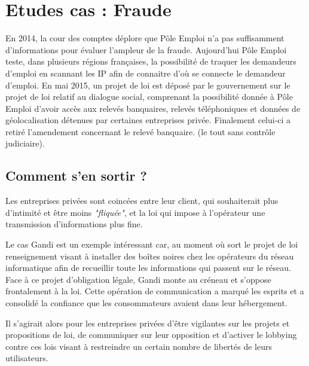 \documentclass[a4paper,12pt]{article}
\begin{document}
\section{Etudes cas : Fraude }
En 2014, la cour des comptes déplore que Pôle Emploi n'a pas suffisamment d'informations pour évaluer l'ampleur de la fraude. Aujourd'hui Pôle Emploi teste, dans plusieurs régions françaises, la possibilité de traquer les demandeurs d'emploi en scannant les IP afin de connaitre d'où se connecte le demandeur d'emploi. 
En mai 2015, un projet de loi est déposé par le gouvernement sur le projet de loi relatif au dialogue social, comprenant la possibilité donnée à Pôle Emploi d'avoir accès aux relevés banquaires, relevés téléphoniques et données de géolocalisation détenues par certaines entreprises privée. Finalement celui-ci a retiré l'amendement concernant le relevé banquaire. (le tout sans contrôle judiciaire). 
\subsection{Comment s'en sortir ? }
Les entreprises privées sont coincées entre leur client, qui souhaiterait plus d'intimité et être moins \textit{"fliquée"}, et la loi qui impose à l'opérateur une transmission d'informations plus fine. 

Le cas Gandi est un exemple intéressant car, au moment où sort le projet de loi renseignement visant à installer des boîtes noires chez les opérateurs du réseau informatique afin de recueillir toute les informations qui passent sur le réseau. Face à ce projet d'obligation légale, Gandi monte au créneau et s'oppose frontalement à la loi. Cette opération de communication a marqué les esprits et a consolidé la confiance que les consommateurs avaient dans leur hébergement. 

Il s'agirait alors pour les entreprises privées d'être vigilantes sur les projets et propositions de loi, de communiquer sur leur opposition et d'activer le lobbying contre ces lois visant à restreindre un certain nombre de libertés de leurs utilisateurs. 




\newpage 
\end{document}

